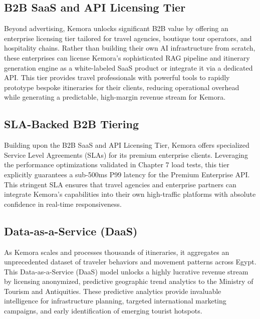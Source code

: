 \subsection{B2B SaaS and API Licensing Tier}
Beyond advertising, Kemora unlocks significant B2B value by offering an enterprise licensing tier tailored for travel agencies, boutique tour operators, and hospitality chains. Rather than building their own AI infrastructure from scratch, these enterprises can license Kemora's sophisticated RAG pipeline and itinerary generation engine as a white-labeled SaaS product or integrate it via a dedicated API. This tier provides travel professionals with powerful tools to rapidly prototype bespoke itineraries for their clients, reducing operational overhead while generating a predictable, high-margin revenue stream for Kemora.

\subsection{SLA-Backed B2B Tiering}
Building upon the B2B SaaS and API Licensing Tier, Kemora offers specialized Service Level Agreements (SLAs) for its premium enterprise clients. Leveraging the performance optimizations validated in Chapter 7 load tests, this tier explicitly guarantees a sub-500ms P99 latency for the Premium Enterprise API. This stringent SLA ensures that travel agencies and enterprise partners can integrate Kemora's capabilities into their own high-traffic platforms with absolute confidence in real-time responsiveness.

\subsection{Data-as-a-Service (DaaS)}
As Kemora scales and processes thousands of itineraries, it aggregates an unprecedented dataset of traveler behaviors and movement patterns across Egypt. This Data-as-a-Service (DaaS) \cite{daas_model} model unlocks a highly lucrative revenue stream by licensing anonymized, predictive geographic trend analytics to the Ministry of Tourism and Antiquities. These predictive analytics provide invaluable intelligence for infrastructure planning, targeted international marketing campaigns, and early identification of emerging tourist hotspots.

